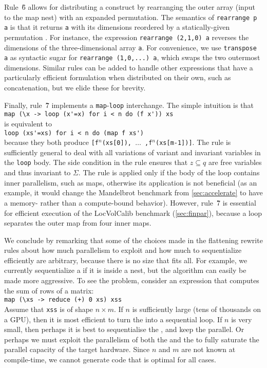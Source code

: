 Rule~\G{6} allows for distributing a  construct by
rearranging the outer array (input to the map nest) with an expanded
permutation.  The semantics of \lstinline{rearrange p a} is that it
returns \lstinline{a} with its dimensions reordered by a
statically-given permutation . For instance, the expression
\mbox{\lstinline{rearrange (2,1,0) a}} reverses the dimensions of the
three-dimensional array \lstinline{a}.
%
For convenience, we use \mbox{\lstinline{transpose a}} as syntactic
sugar for \mbox{\lstinline{rearrange (1,0,...) a}}, which swaps the two
  outermost dimensions.
%
Similar rules can be added to handle other expressions that have a
particularly efficient formulation when distributed on their own,
such as concatenation, but we elide these for brevity.

Finally, rule~\G{7} implements a \lstinline{map}-\lstinline{loop}
interchange.  The
simple intuition is that\\
\hspace*{0.5cm}\lstinline!map (\x -> loop (x'=x) for i < n do (f x')) xs!\\
is equivalent to\\
\hspace*{0.5cm}\lstinline!loop (xs'=xs) for i < n do (map f xs')!\\
because they both produce \texttt{[f$^n$(xs[0]), $\ldots$
  ,f$^n$(xs[m-1])]}.  The rule is sufficiently general to deal with
all variations of variant and invariant variables in the
\lstinline{loop} body.  The side condition in the rule ensures that
$z \subseteq q$ are free variables and thus invariant to $\Sigma$.
The rule is applied only if the body of the loop contains inner
parallelism, such as maps, otherwise its application is not beneficial
(as an example, it would change the Mandelbrot benchmark from
\cref{sec:accelerate} to have a memory- rather than a compute-bound
behavior).
%
However, rule~\G{7} is essential for efficient execution of the
LocVolCalib benchmark (\cref{sec:finpar}), because a loop separates
the outer map from four inner maps.

We conclude by remarking that some of the choices made in the
flattening rewrite rules about how much parallelism to exploit and how
much to sequentialize efficiently are arbitrary, because there is no
size that fits all.  For example, we currently sequentialize a
\StreamPar{} if it is inside a \Map{} nest, but the algorithm can
easily be made more aggressive.  To see the problem, consider an
expression that computes the sum of rows of a matrix:\\
\hspace*{0.5cm}\lstinline{map (\xs -> reduce (+) 0 xs) xss}\\
Assume that \lstinline{xss} is of shape $n\times{}m$.  If $n$ is
sufficiently large (tens of thousands on a GPU), then it is most
efficient to turn the  into a sequential loop.  If $n$ is
very small, then perhaps it is best to sequentialise the , and
keep the  parallel.  Or perhaps we must exploit the
parallelism of both the  and the  to fully saturate
the parallel capacity of the target hardware.  Since $n$ and $m$ are
not known at compile-time, we cannot generate code that is optimal for
all cases.


